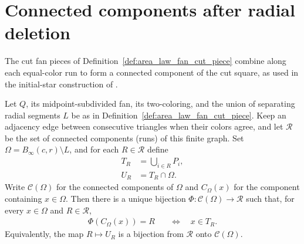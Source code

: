 
\section{Connected components after radial deletion}
\label{sec:area_law_fan_cut_components}

The cut fan pieces of Definition~\ref{def:area_law_fan_cut_piece}
combine along each equal-color run to form a connected component of the cut
square, as used in the initial-star construction of
\cite[Section~11]{OpenAI2026AreaLaw}.

\begin{lemma}
    \label{thm:area_law_fan_cut_component_correspondence}
    \leanok
    Let $Q$, its midpoint-subdivided fan, its two-coloring, and the union of
    separating radial segments $L$ be as in Definition~\ref{def:area_law_fan_cut_piece}.
    Keep an adjacency edge between consecutive triangles when their colors
    agree, and let $\mathcal R$ be the set of connected components (runs) of
    this finite graph. Set $\Omega=B_\infty(c,r)\setminus L$, and for each
    $R\in\mathcal R$ define
    \begin{align}
        T_R & =\bigcup_{i\in R}P_i, \\
        U_R & =T_R\cap\Omega.
    \end{align}
    Write $\mathcal C(\Omega)$ for the connected components of $\Omega$
    and $C_\Omega(x)$ for the component containing $x\in\Omega$.
    Then there is a unique bijection
    $\Phi:\mathcal C(\Omega)\longrightarrow\mathcal R$ such that, for
    every $x\in\Omega$ and $R\in\mathcal R$,
    \begin{align}
        \Phi(C_\Omega(x))=R & \quad\Longleftrightarrow\quad x\in T_R.
        \label{eq:area_law_fan_cut_component_membership}
    \end{align}
    Equivalently, the map $R\mapsto U_R$ is a bijection from $\mathcal R$ onto
    $\mathcal C(\Omega)$.
\end{lemma}
